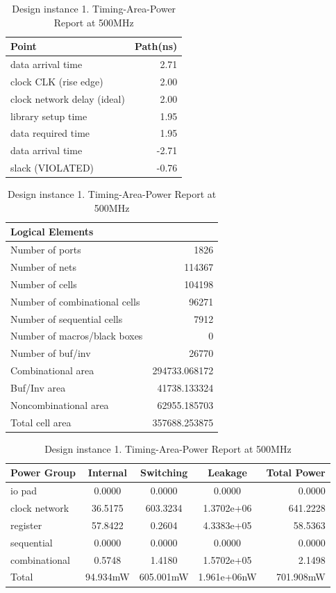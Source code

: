 \documentclass[journal,comsoc]{IEEEtran}
\begin{document}
\begin{table} 
	\centering%
	\caption{Design instance 1. Timing-Area-Power Report at 500MHz}
	\begin{tabular}{@{}lr@{}}
		Point 						&Path(ns)\\
		\hline\hline
		data arrival time   		&2.71\\ 
		clock CLK (rise edge)  		&2.00\\
		clock network delay (ideal) &2.00\\
		library setup time			&1.95\\
		\hline
		data required time			&1.95\\
		data arrival time           &-2.71\\
		\hline
		slack (VIOLATED)            &-0.76\\	
		\hline
	\end{tabular}
	
	\begin{tabular}{@{}lr@{}}\\
		Logical Elements\\
		\hline\hline
		Number of ports                &1826\\
		Number of nets                 &114367\\
		Number of cells                &104198\\
		Number of combinational cells  &96271\\
		Number of sequential cells     &7912\\
		Number of macros/black boxes   &0\\
		Number of buf/inv              &26770\\
		\hline
		Combinational area             &294733.068172\\
		Buf/Inv area                   &41738.133324\\
		Noncombinational area          &62955.185703\\
		\hline
		Total cell area                &357688.253875\\	
		\hline
	\end{tabular}
	
	\begin{tabular}{@{}lcccr@{}}\\
		Power Group		 &Internal 	&Switching 	&Leakage		&Total Power\\
		\hline\hline
		io pad           &0.0000    &0.0000     &0.0000    		&0.0000\\
		clock network    &36.5175   &603.3234   &1.3702e+06 	&641.2228\\
		register         &57.8422   &0.2604     &4.3383e+05 	&58.5363\\  
		sequential       &0.0000    &0.0000     &0.0000     	&0.0000\\  
		combinational    &0.5748    &1.4180     &1.5702e+05 	&2.1498\\ 
		\hline
		Total            &94.934mW  &605.001mW  &1.961e+06nW	&701.908mW\\	
		\hline
	\end{tabular}
	\label{tab:rep_desgin1}	
\end{table}
\end{document}
